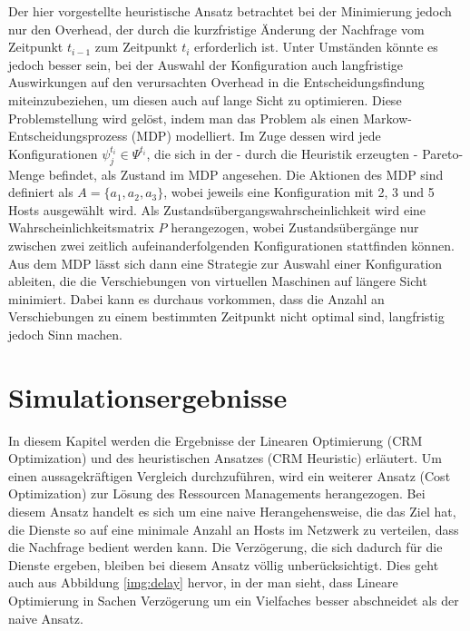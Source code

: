 \documentclass[conference]{IEEEtran}
\begin{document}
Der hier vorgestellte heuristische Ansatz betrachtet bei der Minimierung jedoch nur den Overhead, der durch die kurzfristige Änderung der Nachfrage vom Zeitpunkt \(t_{i-1}\) zum Zeitpunkt \(t_i\) erforderlich ist. Unter Umständen könnte es jedoch besser sein, bei der Auswahl der Konfiguration auch langfristige Auswirkungen auf den verursachten Overhead in die Entscheidungsfindung miteinzubeziehen, um diesen auch auf lange Sicht zu optimieren.
Diese Problemstellung wird gelöst, indem man das Problem als einen Markow-Entscheidungsprozess (MDP) modelliert. Im Zuge dessen wird jede Konfigurationen \(\psi_j^{t_i} \in \Psi^{t_i}\), die sich in der - durch die Heuristik erzeugten - Pareto-Menge befindet, als Zustand im MDP angesehen. Die Aktionen des MDP sind definiert als 
\(A=\{a_1,a_2,a_3\}\), wobei jeweils eine Konfiguration mit 2, 3 und 5 Hosts ausgewählt wird.  Als Zustandsübergangswahrscheinlichkeit wird eine Wahrscheinlichkeitsmatrix \(P\) herangezogen, wobei Zustandsübergänge nur zwischen zwei zeitlich aufeinanderfolgenden Konfigurationen stattfinden können.
Aus dem MDP lässt sich dann eine Strategie zur Auswahl einer Konfiguration ableiten, die die Verschiebungen von virtuellen Maschinen auf längere Sicht minimiert. Dabei kann es durchaus vorkommen, dass die Anzahl an Verschiebungen zu einem bestimmten Zeitpunkt nicht optimal sind, langfristig jedoch Sinn machen.


\section{Simulationsergebnisse}

In diesem Kapitel werden die Ergebnisse der Linearen Optimierung (CRM Optimization) und des heuristischen Ansatzes (CRM Heuristic) erläutert. Um einen aussagekräftigen Vergleich durchzuführen, wird ein weiterer Ansatz (Cost Optimization) zur Lösung des Ressourcen Managements herangezogen. Bei diesem Ansatz handelt es sich um eine naive Herangehensweise, die das Ziel hat, die Dienste so auf eine minimale Anzahl an Hosts im Netzwerk zu verteilen, dass die Nachfrage bedient werden kann. Die Verzögerung, die sich dadurch für die Dienste ergeben, bleiben bei diesem Ansatz völlig unberücksichtigt. Dies geht auch aus Abbildung \ref{img:delay} hervor, in der man sieht, dass Lineare Optimierung in Sachen Verzögerung um ein Vielfaches besser abschneidet als der naive Ansatz.
\end{document}
